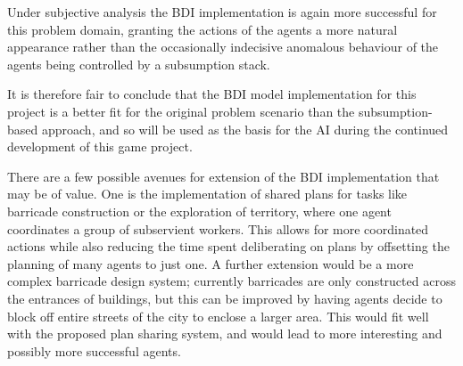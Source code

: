 \documentclass[12pt,a4paper]{article}
\begin{document}
Under subjective analysis the BDI implementation is again more successful for this problem domain, granting the actions of the agents a more natural appearance rather than the occasionally indecisive anomalous behaviour of the agents being controlled by a subsumption stack.

It is therefore fair to conclude that the BDI model implementation for this project is a better fit for the original problem scenario than the subsumption-based approach, and so will be used as the basis for the AI during the continued development of this game project.

There are a few possible avenues for extension of the BDI implementation that may be of value. One is the implementation of shared plans for tasks like barricade construction or the exploration of territory, where one agent coordinates a group of subservient workers. This allows for more coordinated actions while also reducing the time spent deliberating on plans by offsetting the planning of many agents to just one. A further extension would be a more complex barricade design system; currently barricades are only constructed across the entrances of buildings, but this can be improved by having agents decide to block off entire streets of the city to enclose a larger area. This would fit well with the proposed plan sharing system, and would lead to more interesting and possibly more successful agents.


\end{document}

